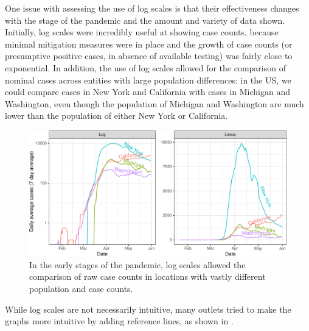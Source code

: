 \documentclass[article]{jdssv}\usepackage[]{graphicx}\usepackage[]{xcolor}
\newenvironment{knitrout}{}{} %
\begin{document}
One issue with assessing the use of log scales is that their effectiveness changes with the stage of the pandemic and the amount and variety of data shown. Initially, log scales were incredibly useful at showing case counts, because minimal mitigation measures were in place and the growth of case counts (or presumptive positive cases, in absence of available testing) was fairly close to exponential. In addition, the use of log scales allowed for the comparison of nominal cases across entities with large population differences: in the US, we could compare cases in New York and California with cases in Michigan and Washington, even though the population of Michigan and Washington are much lower than the population of either New York or California. 

\begin{knitrout}\footnotesize
{}\color{fgcolor}\begin{figure}

{\centering \includegraphics[width=\linewidth]{Figures_R/fig-log-scale-initial-1} 

}

\caption[In the early stages of the pandemic, log scales allowed the comparison of raw case counts in locations with vastly different population and case counts]{In the early stages of the pandemic, log scales allowed the comparison of raw case counts in locations with vastly different population and case counts.}\label{fig:log-scale-initial}
\end{figure}

\end{knitrout}

While log scales are not necessarily intuitive, many outlets tried to make the graphs more intuitive by adding reference lines, as shown in . 
\end{document}
